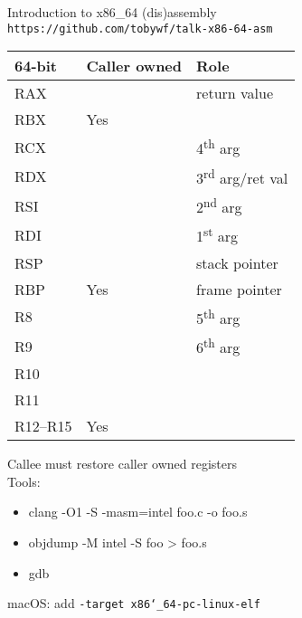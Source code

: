 \documentclass[12pt]{article}
\begin{document}
\begin{center}
Introduction to x86\_64 (dis)assembly\\
\texttt{https://github.com/tobywf/talk-x86-64-asm}
\end{center}
\begin{tabularx}{0.45\textwidth}{l|p{1.2cm}|X|}
64-bit & Caller owned & Role \\
\hline
RAX & & return value \\
RBX & Yes &  \\
RCX & & 4\textsuperscript{th} arg \\
RDX & & 3\textsuperscript{rd} arg/ret val \\
\hline
RSI & & 2\textsuperscript{nd} arg \\
RDI & & 1\textsuperscript{st} arg \\
RSP & & stack pointer \\
RBP & Yes & frame pointer \\
\hline
R8 & & 5\textsuperscript{th} arg \\
R9 & & 6\textsuperscript{th} arg \\
R10 & &  \\
R11 & &  \\
\hline
R12--R15 & Yes & \\
\hline
\end{tabularx}
\hspace{5pt}
\begin{minipage}{0.5\textwidth}
Callee must restore caller owned registers
\\[15pt]
Tools: {\ttfamily
\begin{itemize}[noitemsep, topsep=0pt]
\item clang -O1 -S -masm=intel foo.c -o foo.s
\item objdump -M intel -S foo > foo.s
\item gdb
\end{itemize}}
\vspace{15pt}
macOS: add \texttt{-target x86\char`_64-pc-linux-elf}
\end{minipage}
\end{document}
